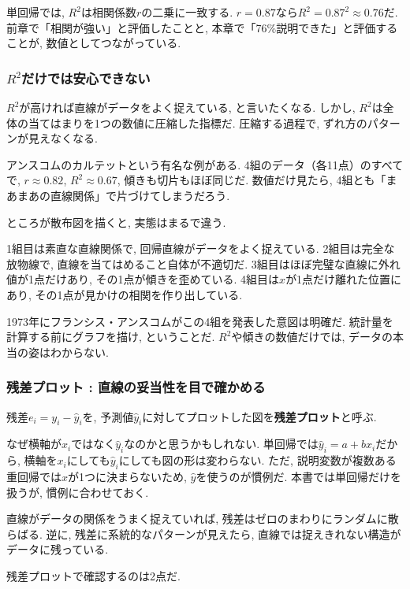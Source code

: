 単回帰では, $R^2$は相関係数$r$の二乗に一致する.
$r = 0.87$なら$R^2 = 0.87^2 \approx 0.76$だ.
前章で「相関が強い」と評価したことと, 本章で「76\%説明できた」と評価することが, 数値としてつながっている.

\subsubsection*{$R^2$だけでは安心できない}

$R^2$が高ければ直線がデータをよく捉えている, と言いたくなる.
しかし, $R^2$は全体の当てはまりを1つの数値に圧縮した指標だ.
圧縮する過程で, ずれ方のパターンが見えなくなる.

アンスコムのカルテットという有名な例がある.
4組のデータ（各11点）のすべてで, $r \approx 0.82$, $R^2 \approx 0.67$, 傾きも切片もほぼ同じだ.
数値だけ見たら, 4組とも「まあまあの直線関係」で片づけてしまうだろう.

ところが散布図を描くと, 実態はまるで違う.


1組目は素直な直線関係で, 回帰直線がデータをよく捉えている.
2組目は完全な放物線で, 直線を当てはめること自体が不適切だ.
3組目はほぼ完璧な直線に外れ値が1点だけあり, その1点が傾きを歪めている.
4組目は$x$が1点だけ離れた位置にあり, その1点が見かけの相関を作り出している.

1973年にフランシス・アンスコムがこの4組を発表した意図は明確だ.
統計量を計算する前にグラフを描け, ということだ.
$R^2$や傾きの数値だけでは, データの本当の姿はわからない.

\subsubsection*{残差プロット : 直線の妥当性を目で確かめる}

残差$e_i = y_i - \hat{y}_i$を, 予測値$\hat{y}_i$に対してプロットした図を\textbf{残差プロット}と呼ぶ.

なぜ横軸が$x_i$ではなく$\hat{y}_i$なのかと思うかもしれない.
単回帰では$\hat{y}_i = a + bx_i$だから, 横軸を$x_i$にしても$\hat{y}_i$にしても図の形は変わらない.
ただ, 説明変数が複数ある重回帰では$x$が1つに決まらないため, $\hat{y}$を使うのが慣例だ.
本書では単回帰だけを扱うが, 慣例に合わせておく.

直線がデータの関係をうまく捉えていれば, 残差はゼロのまわりにランダムに散らばる.
逆に, 残差に系統的なパターンが見えたら, 直線では捉えきれない構造がデータに残っている.

残差プロットで確認するのは2点だ.

